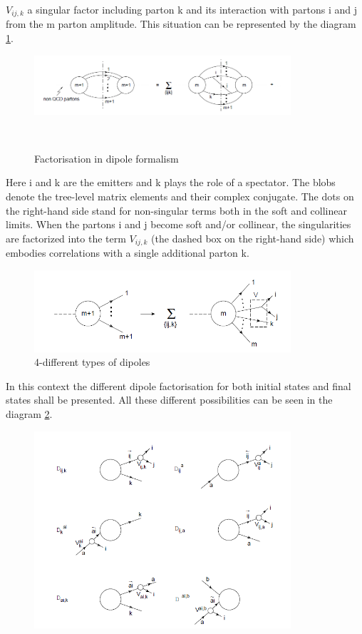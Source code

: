 $ V_{ij,k} $ a singular factor including parton k and its interaction with partons i and j from the m parton amplitude. This situation can be represented by the diagram \ref{factorisationPic}.

\begin{figure}[h!]
\centering
\includegraphics[width=0.85\textwidth]{images/Intro/factorisationPic.png}
\caption{Factorisation in dipole formalism}
\label{factorisationPic}
~\cite{Catani:1996vz, Catani:2002hc}
\end{figure}

Here i and k are the emitters and k plays the role of a spectator. The blobs denote the tree-level matrix elements and their complex conjugate. The dots on the right-hand side stand for non-singular terms both in the soft and collinear limits.
When the partons i and j become soft and/or collinear, the singularities are factorized into the term $ V_{ij,k} $ (the
dashed box on the right-hand side) which embodies correlations with a single additional parton k.

\begin{figure}[h!]
\centering
\includegraphics[width=0.85\textwidth]{images/Intro/factorisationPic2.png}
\caption{4-different types of dipoles}
\label{factorisationPic2}
\end{figure}

In this context the different dipole factorisation for both initial states and final states shall be presented. All these different possibilities can be seen in the diagram \ref{factorisationPic2}.

\begin{figure}[h!]
\centering
\includegraphics[width=0.85\textwidth]{images/Intro/Dipole.png}
\end{figure}

